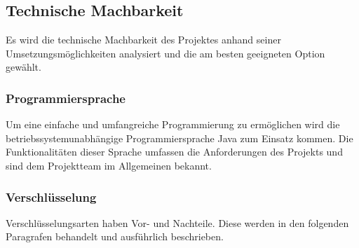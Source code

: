 \subsection{Technische Machbarkeit}
Es wird die technische Machbarkeit des Projektes anhand seiner Umsetzungsmöglichkeiten analysiert und die am besten geeigneten Option gewählt.
\subsubsection{Programmiersprache}
Um eine einfache und umfangreiche Programmierung zu ermöglichen wird die betriebssystemunabhängige Programmiersprache Java zum Einsatz kommen. Die Funktionalitäten dieser Sprache umfassen die Anforderungen des Projekts und sind dem Projektteam im Allgemeinen bekannt.
\subsubsection{Verschlüsselung}
Verschlüsselungsarten haben Vor- und Nachteile. Diese werden in den folgenden Paragrafen behandelt und ausführlich beschrieben.
